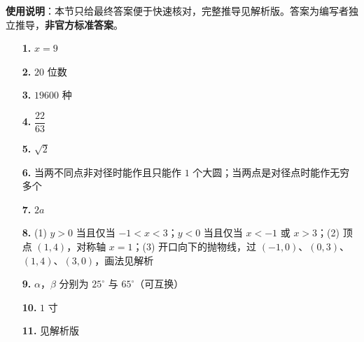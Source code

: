 
\begin{gknotice}
\textbf{使用说明}：本节只给最终答案便于快速核对，完整推导见解析版。答案为编写者独立推导，\textbf{非官方标准答案}。
\end{gknotice}

\begin{itemize}[leftmargin=2.6em]
  \item[\textbf{1.}] $x=9$
  \item[\textbf{2.}] $20$ 位数
  \item[\textbf{3.}] $19600$ 种
  \item[\textbf{4.}] $\dfrac{22}{63}$
  \item[\textbf{5.}] $\sqrt{2}$
  \item[\textbf{6.}] 当两不同点非对径时能作且只能作 $1$ 个大圆；当两点是对径点时能作无穷多个
  \item[\textbf{7.}] $2a$
  \item[\textbf{8.}] (1) $y>0$ 当且仅当 $-1<x<3$；$y<0$ 当且仅当 $x<-1$ 或 $x>3$；(2) 顶点 $(1,4)$，对称轴 $x=1$；(3) 开口向下的抛物线，过 $(-1,0)$、$(0,3)$、$(1,4)$、$(3,0)$，画法见解析
  \item[\textbf{9.}] $\alpha$，$\beta$ 分别为 $25^\circ$ 与 $65^\circ$（可互换）
  \item[\textbf{10.}] $1$ 寸
  \item[\textbf{11.}] 见解析版
\end{itemize}
